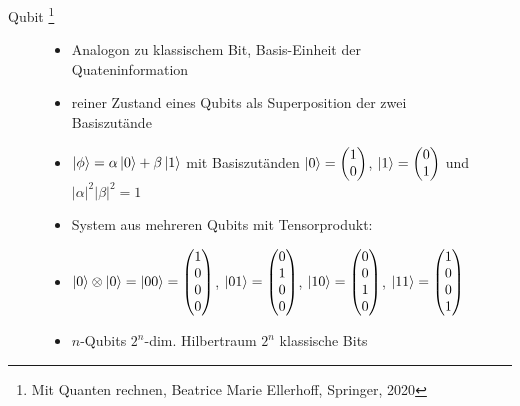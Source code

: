 \documentclass[aspectratio=1610, 9pt]{beamer}
\begin{document}
\begin{frame}{Qubit \footnote[14]{Mit Quanten rechnen, Beatrice Marie Ellerhoff, Springer, 2020}}
  \begin{figure}
    \begin{minipage}{0.49\textwidth}
      \begin{itemize}
        \item Analogon zu klassischem Bit, Basis-Einheit der Quateninformation
        \item reiner Zustand eines Qubits als Superposition der zwei Basiszutände
        \item[] $\ket{\phi} = \alpha \ket{0} + \beta \ket{1} $ mit Basiszutänden $\ket{0} = \begin{pmatrix}1\\0\end{pmatrix}$, $\ket{1} = \begin{pmatrix}0\\1\end{pmatrix}$ und $|\alpha|^2 |\beta|^2 = 1$
        \item System aus mehreren Qubits mit Tensorprodukt:
        \item[] $\ket{0} \otimes \ket{0} = \ket{00} = \begin{pmatrix}1\\0\\0\\0\end{pmatrix}$, $\ket{01} = \begin{pmatrix}0\\1\\0\\0\end{pmatrix}$, $\ket{10} = \begin{pmatrix}0\\0\\1\\0\end{pmatrix}$, $\ket{11} = \begin{pmatrix}1\\0\\0\\1\end{pmatrix}$
        \item $n$-Qubits \rightarrow $2^n$-dim. Hilbertraum \rightarrow $2^n$ klassische Bits
      \end{itemize}
    \end{minipage}
    \hfill
    \begin{minipage}{0.49\textwidth}
      \begin{itemize}

\end{itemize}
\end{minipage}
\end{figure}
\end{frame}
\end{document}
